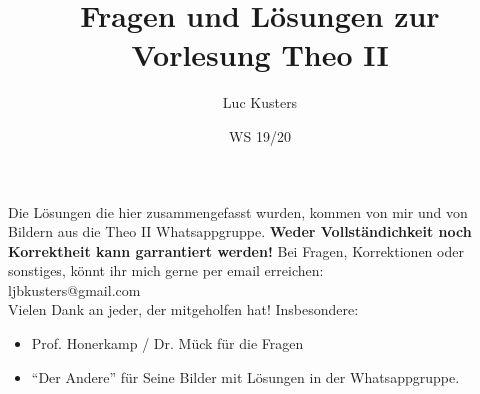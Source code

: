 \documentclass{scrartcl}
\title{Fragen und Lösungen zur Vorlesung Theo II}
\author{Luc Kusters}
\date{WS 19/20}
\begin{document}
\maketitle

\noindent
Die Lösungen die hier zusammengefasst wurden, kommen von mir und von Bildern
aus die Theo II Whatsappgruppe. 
\textbf{Weder Vollständichkeit noch Korrektheit kann garrantiert werden!}
Bei Fragen, Korrektionen oder sonstiges, könnt ihr mich gerne per 
email erreichen:\\ 
ljbkusters@gmail.com \\


\noindent
Vielen Dank an jeder, der mitgeholfen hat! Insbesondere:
\begin{itemize}
  \item Prof. Honerkamp / Dr. Mück für die Fragen
  \item ``Der Andere'' für Seine Bilder mit Lösungen in der Whatsappgruppe.
\end{itemize}

\clearpage
\newpage
\setcounter{page}{1}
\tableofcontents
\newpage
\end{document}
